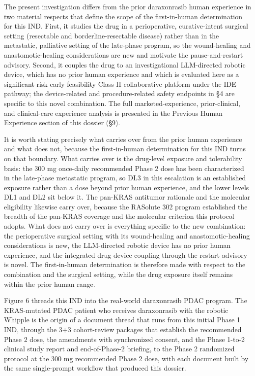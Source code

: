 The present investigation differs from the prior daraxonrasib human experience in
two material respects that define the scope of the first-in-human determination for
this IND. First, it studies the drug in a perioperative, curative-intent surgical
setting (resectable and borderline-resectable disease) rather than in the
metastatic, palliative setting of the late-phase program, so the wound-healing and
anastomotic-healing considerations are new and motivate the pause-and-restart
advisory. Second, it couples the drug to an investigational LLM-directed robotic
device, which has no prior human experience and which is evaluated here as a
significant-risk early-feasibility Class II collaborative platform under the IDE
pathway; the device-related and procedure-related safety endpoints in \S 4 are
specific to this novel combination. The full marketed-experience, prior-clinical,
and clinical-care experience analysis is presented in the Previous Human Experience
section of this dossier (\S 9).

It is worth stating precisely what carries over from the prior human experience and
what does not, because the first-in-human determination for this IND turns on that
boundary. What carries over is the drug-level exposure and tolerability basis: the
300 mg once-daily recommended Phase 2 dose has been characterized in the late-phase
metastatic program, so DL3 in this escalation is an established exposure rather than
a dose beyond prior human experience, and the lower levels DL1 and DL2 sit below it.
The pan-KRAS antitumor rationale and the molecular eligibility likewise carry over,
because the RASolute 302 program established the breadth of the pan-KRAS coverage and
the molecular criterion this protocol adopts. What does not carry over is everything
specific to the new combination: the perioperative surgical setting with its
wound-healing and anastomotic-healing considerations is new, the LLM-directed robotic
device has no prior human experience, and the integrated drug-device coupling through
the restart advisory is novel. The first-in-human determination is therefore made
with respect to the combination and the surgical setting, while the drug exposure
itself remains within the prior human range.

Figure 6 threads this IND into the real-world daraxonrasib PDAC program. The
KRAS-mutated PDAC patient who receives daraxonrasib with the robotic Whipple is the
origin of a document thread that runs from this initial Phase 1 IND, through the 3+3
cohort-review packages that establish the recommended Phase 2 dose, the amendments
with synchronized consent, and the Phase 1-to-2 clinical study report and
end-of-Phase-2 briefing, to the Phase 2 randomized protocol at the 300 mg
recommended Phase 2 dose, with each document built by the same single-prompt
workflow that produced this dossier.

